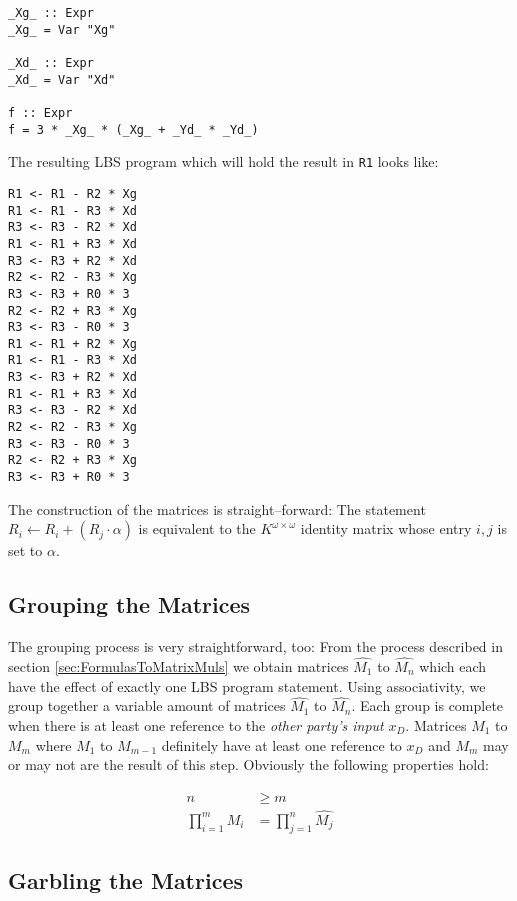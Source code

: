 \documentclass[12pt, a4paper]{article}
\begin{document}
\begin{lstlisting}
_Xg_ :: Expr
_Xg_ = Var "Xg"

_Xd_ :: Expr
_Xd_ = Var "Xd"

f :: Expr
f = 3 * _Xg_ * (_Xg_ + _Yd_ * _Yd_)
\end{lstlisting}

\noindent{}The resulting LBS program which will hold the result in \texttt{R1}
looks like:

\begin{lstlisting}
R1 <- R1 - R2 * Xg
R1 <- R1 - R3 * Xd
R3 <- R3 - R2 * Xd
R1 <- R1 + R3 * Xd
R3 <- R3 + R2 * Xd
R2 <- R2 - R3 * Xg
R3 <- R3 + R0 * 3
R2 <- R2 + R3 * Xg
R3 <- R3 - R0 * 3
R1 <- R1 + R2 * Xg
R1 <- R1 - R3 * Xd
R3 <- R3 + R2 * Xd
R1 <- R1 + R3 * Xd
R3 <- R3 - R2 * Xd
R2 <- R2 - R3 * Xg
R3 <- R3 - R0 * 3
R2 <- R2 + R3 * Xg
R3 <- R3 + R0 * 3
\end{lstlisting}

\noindent{}The construction of the matrices is straight--forward: The statement
$R_i \leftarrow R_i + (R_j \cdot \alpha)$ is equivalent to the $K^{\omega \times
\omega}$ identity matrix whose entry $i,j$ is set to $\alpha$.


\subsection{Grouping the Matrices}
\label{sec:matrix-grouping}

The grouping process is very straightforward, too: From the process described in
section \ref{sec:FormulasToMatrixMuls} we obtain matrices $\widehat{M_1}$ to
$\widehat{M_n}$ which each have the effect of exactly one LBS program statement.
Using associativity, we group together a variable amount of matrices
$\widehat{M_1}$ to $\widehat{M_n}$. Each group is complete when there is at
least one reference to the \emph{other party's input} $x_D$.  Matrices $M_1$ to
$M_m$ where $M_1$ to $M_{m-1}$ definitely have at least one reference to $x_D$
and $M_m$ may or may not are the result of this step.  Obviously the following
properties hold:

\begin{align*}
n & \geq m \\
\prod_{i=1}^m M_i & = \prod_{j=1}^n \widehat{M_j}
\end{align*}

\subsection{Garbling the Matrices}
\label{sec:matrix-garbling}
\end{document}
